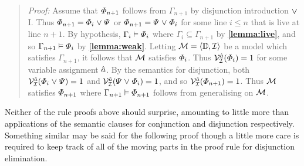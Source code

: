 
\begin{quote} 
  \textit{Proof:} Assume that $\varPhi_{n+1}$ follows from $\Gamma_{n+1}$ by disjunction introduction $\mkern1mu\vee\mkern1mu$I.
  Thus $\varPhi_{n+1}=\varPhi_i\mkern1mu\vee\mkern1mu\varPsi$ or $\varPhi_{n+1}=\varPsi\mkern1mu\vee\mkern1mu\varPhi_i$ for some line $i\leq n$ that is live at line $n+1$.
  By hypothesis, $\Gamma_i\vDash \varPhi_i$ where $\Gamma_i\subseteq \Gamma_{n+1}$ by \textbf{\ref{lemma:live}}, and so $\Gamma_{n+1} \vDash \varPhi_i$ by \textbf{\ref{lemma:weak}}.
  Letting $\mathcal{M}=\langle\mathbb{D},\mathcal{I}\rangle$ be a model which satisfies $\Gamma_{n+1}$, it follows that $\mathcal{M}$ satisfies $\varPhi_i$.
  Thus $\mathcal{V}_{\mathcal{I}}^{\hat{a}}(\varPhi_i)=1$ for some variable assignment $\hat{a}$.
  By the semantics for disjunction, both $\mathcal{V}_{\mathcal{I}}^{\hat{a}}(\varPhi_{i}\mkern1mu\vee\mkern1mu\varPsi)=1$ and $\mathcal{V}_{\mathcal{I}}^{\hat{a}}(\varPsi\mkern1mu\vee\mkern1mu\varPhi_{i})=1$, and so $\mathcal{V}_{\mathcal{I}}^{\hat{a}}(\varPhi_{n+1})=1$.
  Thus $\mathcal{M}$ satisfies $\varPhi_{n+1}$ where $\Gamma_{n+1} \vDash \varPhi_{n+1}$ follows from generalising on $\mathcal{M}$.
\end{quote}




Neither of the rule proofs above should surprise, amounting to little more than applications of the semantic clauses for conjunction and disjunction respectively.
Something similar may be said for the following proof though a little more care is required to keep track of all of the moving parts in the proof rule for disjunction elimination.


